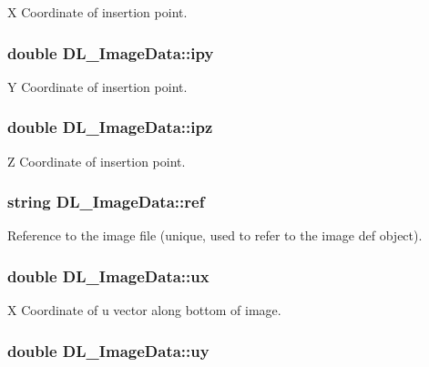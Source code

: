 X Coordinate of insertion point. \hypertarget{structDL__ImageData_aacb562ea979a2031519f26de48de32e6}{
\subsubsection[{ipy}]{\setlength{\rightskip}{0pt plus 5cm}double D\-L\-\_\-\-Image\-Data\-::ipy}}\label{structDL__ImageData_aacb562ea979a2031519f26de48de32e6}
Y Coordinate of insertion point. \hypertarget{structDL__ImageData_a0b35d716d697629558b5af6e9cbb00f5}{
\subsubsection[{ipz}]{\setlength{\rightskip}{0pt plus 5cm}double D\-L\-\_\-\-Image\-Data\-::ipz}}\label{structDL__ImageData_a0b35d716d697629558b5af6e9cbb00f5}
Z Coordinate of insertion point. \hypertarget{structDL__ImageData_ae3a5ca8dacf800eb6d957e8526802b4a}{
\subsubsection[{ref}]{\setlength{\rightskip}{0pt plus 5cm}string D\-L\-\_\-\-Image\-Data\-::ref}}\label{structDL__ImageData_ae3a5ca8dacf800eb6d957e8526802b4a}
Reference to the image file (unique, used to refer to the image def object). \hypertarget{structDL__ImageData_acad3e28ee5c9654d851120928a4aeb88}{
\subsubsection[{ux}]{\setlength{\rightskip}{0pt plus 5cm}double D\-L\-\_\-\-Image\-Data\-::ux}}\label{structDL__ImageData_acad3e28ee5c9654d851120928a4aeb88}
X Coordinate of u vector along bottom of image. \hypertarget{structDL__ImageData_a51bf669167d8017f8a3272628a8b3c57}{
\subsubsection[{uy}]{\setlength{\rightskip}{0pt plus 5cm}double D\-L\-\_\-\-Image\-Data\-::uy}}\label{structDL__ImageData_a51bf669167d8017f8a3272628a8b3c57}
